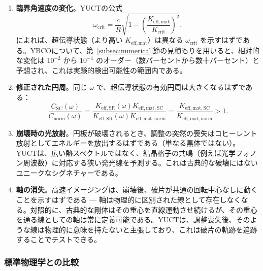 \documentclass[12pt,a4paper]{article}
\begin{document}
	\begin{enumerate}
		\item \textbf{臨界角速度の変化}。YUCTの公式
		\[
		\omega_{\text{crit}} = \frac{c}{R}\sqrt{1 - \left(\frac{K_{\mathrm{eff,mat}}}{K_{\mathrm{crit}}}\right)^2},
		\]
		によれば、超伝導状態（より高い \(K_{\mathrm{eff,mat}}\)）は異なる \(\omega_{\text{crit}}\) を示すはずである。YBCOについて、第~\ref{subsec:numerical}節の見積もりを用いると、相対的な変化は \(10^{-2}\) から \(10^{-1}\) のオーダー（数パーセントから数十パーセント）と予想され、これは実験的検出可能性の範囲内である。
		
		\item \textbf{修正された円周}。同じ \(\omega\) で、超伝導状態の有効円周は大きくなるはずである：
		\[
		\frac{C_{\text{SC}}(\omega)}{C_{\text{norm}}(\omega)} = \frac{K_{\mathrm{eff,SR}}(\omega) K_{\mathrm{eff,mat,SC}}}{K_{\mathrm{eff,SR}}(\omega) K_{\mathrm{eff,mat,norm}}} = \frac{K_{\mathrm{eff,mat,SC}}}{K_{\mathrm{eff,mat,norm}}} > 1.
		\]
		
		\item \textbf{崩壊時の光放射}。円板が破壊されるとき、調整の突然の喪失はコヒーレント放射としてエネルギーを放出するはずである（単なる黒体ではない）。YUCTは、広い熱スペクトルではなく、結晶格子の共鳴（例えば光学フォノン周波数）に対応する狭い発光線を予測する。これは古典的な破壊にはないユニークなシグネチャーである。
		
		\item \textbf{軸の消失}。高速イメージングは、崩壊後、破片が共通の回転中心なしに動くことを示すはずである — 軸は物理的に区別された線として存在しなくなる。対照的に、古典的な剛体はその重心を直線運動させ続けるが、その重心を通る線としての軸は常に定義可能である。YUCTは、調整喪失後、そのような線は物理的に意味を持たないと主張しており、これは破片の軌跡を追跡することでテストできる。
	\end{enumerate}
	
	\subsubsection{標準物理学との比較}
	
\end{document}
